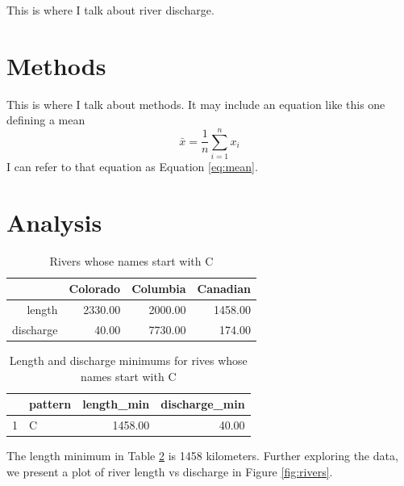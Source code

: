 \documentclass[]{interact}
\theoremstyle{plain}%
\theoremstyle{definition}
\theoremstyle{remark}
\begin{document}
This is where I talk about river discharge.

\hypertarget{sec:methods}{%
\section{Methods}\label{sec:methods}}

This is where I talk about methods. It may include an equation like this
one defining a mean \begin{equation}\label{eq:mean}
  \bar{x} = \frac{1}{n}\sum_{i = 1}^n x_i
\end{equation} I can refer to that equation as Equation \ref{eq:mean}.

\hypertarget{sec:analysis}{%
\section{Analysis}\label{sec:analysis}}

\begin{table}[ht]
\centering
\begin{tabular}{rrrr}
  \hline
 & Colorado & Columbia & Canadian \\ 
  \hline
length & 2330.00 & 2000.00 & 1458.00 \\ 
  discharge & 40.00 & 7730.00 & 174.00 \\ 
   \hline
\end{tabular}
\caption{Rivers whose names start with C} 
\label{tab:rivers_C}
\end{table}
\begin{table}[ht]
\centering
\begin{tabular}{rlrr}
  \hline
 & pattern & length\_min & discharge\_min \\ 
  \hline
1 & C & 1458.00 & 40.00 \\ 
   \hline
\end{tabular}
\caption{Length and discharge minimums for rives whose names start with C} 
\label{tab:rivers_min}
\end{table}

The length minimum in Table \ref{tab:rivers_min} is 1458 kilometers.
Further exploring the data, we present a plot of river length vs
discharge in Figure \ref{fig:rivers}.
\end{document}
